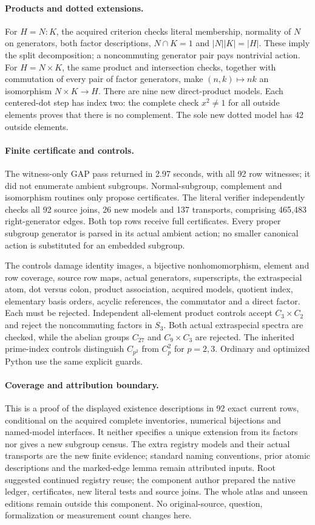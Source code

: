 \documentclass[11pt]{article}
\begin{document}
\paragraph{Products and dotted extensions.}
For $H=N:K$, the acquired criterion checks literal membership, normality
of $N$ on generators, both factor descriptions, $N\cap K=1$ and
$|N||K|=|H|$. These imply the split decomposition; a noncommuting generator
pair pays nontrivial action. For $H=N\times K$, the same product and
intersection checks, together with commutation of every pair of factor
generators, make $(n,k)\mapsto nk$ an isomorphism $N\times K\to H$.
There are nine new direct-product models. Each centered-dot step has index
two: the complete check $x^2\ne1$ for all outside elements proves that
there is no complement. The sole new dotted model has 42 outside elements.

\newpage
\paragraph{Finite certificate and controls.}
The witness-only GAP pass returned in 2.97 seconds, with all 92 row
witnesses; it did not enumerate ambient subgroups. Normal-subgroup,
complement and isomorphism routines only propose certificates. The literal
verifier independently checks all 92 source joins, 26 new models and
137 transports, comprising 465,483 right-generator edges. Both top rows
receive full certificates. Every proper subgroup generator is parsed in
its actual ambient action; no smaller canonical action is substituted for
an embedded subgroup.

The controls damage identity images, a bijective nonhomomorphism,
element and row coverage, source row maps, actual generators, superscripts,
the extraspecial atom, dot versus colon, product association, acquired
models, quotient index, elementary basis orders, acyclic references, the
commutator and a direct factor. Each must be rejected. Independent
all-element product controls accept $C_3\times C_2$ and reject the
noncommuting factors in $S_3$. Both actual extraspecial spectra are checked,
while the abelian groups $C_{27}$ and $C_9\times C_3$ are rejected.
The inherited prime-index controls distinguish $C_{p^2}$ from $C_p^2$ for
$p=2,3$. Ordinary and optimized Python use the same explicit guards.

\paragraph{Coverage and attribution boundary.}
This is a proof of the displayed existence descriptions in 92 exact
current rows, conditional on the acquired complete inventories, numerical
bijections and named-model interfaces. It neither specifies a unique
extension from its factors nor gives a new subgroup census. The extra
registry models and their actual transports are the new finite evidence;
standard naming conventions, prior atomic descriptions and the
marked-edge lemma remain attributed inputs. Root suggested continued
registry reuse; the component author prepared the native ledger,
certificates, new literal tests and source joins. The whole atlas and
unseen editions remain outside this component. No original-source,
question, formalization or measurement count changes here.
\end{document}
